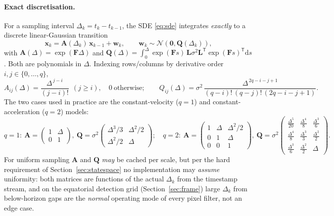 \documentclass[11pt]{article}
\newcommand{\Norm}{\mathcal{N}}
\newcommand{\T}{^{\mathsf{T}}}
\newcommand{\dd}{\mathrm{d}}
\begin{document}
\paragraph{Exact discretisation.}
For a sampling interval $\Delta_k=t_k-t_{k-1}$, the SDE \eqref{eq:sde} integrates
\emph{exactly} to a discrete linear-Gaussian transition
\begin{equation}
  \bm{x}_k = \bm{A}(\Delta_k)\,\bm{x}_{k-1} + \bm{w}_k,
  \qquad \bm{w}_k\sim\Norm(\bm 0,\bm{Q}(\Delta_k)),
  \label{eq:disc}
\end{equation}
with $\bm{A}(\Delta)=\exp(\bm{F}\Delta)$ and
$\bm{Q}(\Delta)=\int_0^{\Delta}\!\exp(\bm{F}s)\,\bm{L}\sigma^2\bm{L}\T\exp(\bm{F}s)\T\dd s$.
Both are polynomials in $\Delta$. Indexing rows/columns by derivative order
$i,j\in\{0,\dots,q\}$,
\begin{equation}
  A_{ij}(\Delta)=\frac{\Delta^{\,j-i}}{(j-i)!}\ \ (j\ge i),\quad 0\ \text{otherwise};
  \qquad
  Q_{ij}(\Delta)=\sigma^2\,\frac{\Delta^{\,2q-i-j+1}}{(q-i)!\,(q-j)!\,(2q-i-j+1)} .
  \label{eq:AQ}
\end{equation}
The two cases used in practice are the constant-velocity ($q{=}1$) and
constant-acceleration ($q{=}2$) models:
\begin{equation*}
  q{=}1:\
  \bm{A}=\begin{pmatrix}1&\Delta\\0&1\end{pmatrix},\
  \bm{Q}=\sigma^2\begin{pmatrix}\Delta^3/3&\Delta^2/2\\\Delta^2/2&\Delta\end{pmatrix};
  \quad
  q{=}2:\
  \bm{A}=\begin{pmatrix}1&\Delta&\Delta^2/2\\0&1&\Delta\\0&0&1\end{pmatrix},\
  \bm{Q}=\sigma^2\!\begin{pmatrix}\tfrac{\Delta^5}{20}&\tfrac{\Delta^4}{8}&\tfrac{\Delta^3}{6}\\[2pt]
  \tfrac{\Delta^4}{8}&\tfrac{\Delta^3}{3}&\tfrac{\Delta^2}{2}\\[2pt]
  \tfrac{\Delta^3}{6}&\tfrac{\Delta^2}{2}&\Delta\end{pmatrix}.
\end{equation*}
For uniform sampling $\bm{A}$ and $\bm{Q}$ \emph{may} be cached per scale, but per the hard
requirement of Section~\ref{sec:statespace} no implementation may \emph{assume} uniformity: both
matrices are functions of the actual $\Delta_k$ from the timestamp stream, and on the equatorial
detection grid (Section~\ref{sec:frame}) large $\Delta_k$ from below-horizon gaps are the
\emph{normal} operating mode of every pixel filter, not an edge case.
\end{document}
